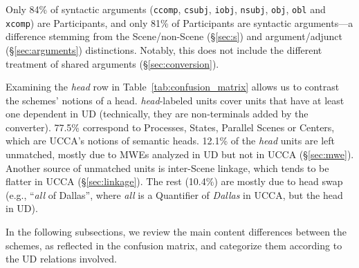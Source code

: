 \documentclass[11pt,a4paper]{article}
\begin{document}
Only 84\% of syntactic arguments
(\texttt{ccomp}, \texttt{csubj}, \texttt{iobj}, \texttt{nsubj}, \texttt{obj}, \texttt{obl} and \texttt{xcomp})
are Participants,
and only 81\% of Participants are syntactic arguments---a difference stemming from
the Scene/non-Scene (\S\ref{sec:s}) and argument/adjunct (\S\ref{sec:arguments}) distinctions.
Notably, this does not include the different treatment of shared arguments (\S\ref{sec:conversion}).

Examining the {\it head} row in Table~\ref{tab:confusion_matrix} allows
us to contrast the schemes' notions of a head. 
{\it head}-labeled units cover units that have at least
one dependent in UD (technically, they are non-terminals added by the converter).
77.5\% correspond to Processes, States, Parallel Scenes or Centers,
which are UCCA's notions of semantic heads.
12.1\% of the {\it head} units are left unmatched, mostly due to MWEs analyzed in
UD but not in UCCA (\S\ref{sec:mwe}).
Another source of unmatched units is inter-Scene linkage, which tends to be flatter in
UCCA (\S\ref{sec:linkage}).
The rest (10.4\%) are mostly due to head swap (e.g., ``\textit{all} of Dallas'', where \textit{all}
is a Quantifier of \textit{Dallas} in UCCA, but the head in UD).

In the following subsections, we review the main content differences between the schemes,
as reflected in the confusion matrix, and categorize them according to the UD relations
involved.
\end{document}
